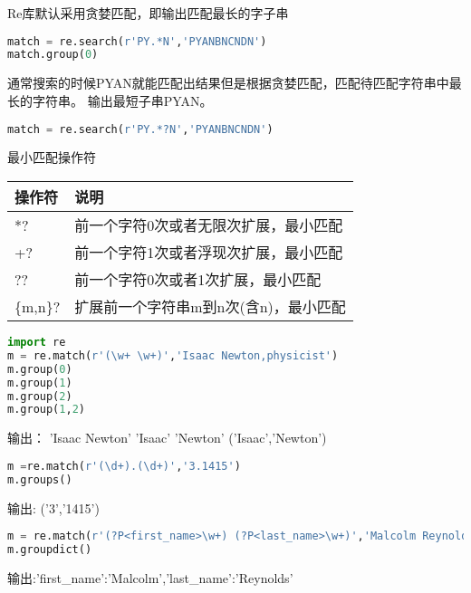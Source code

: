 Re库默认采用贪婪匹配，即输出匹配最长的字子串
\begin{lstlisting}[language=Python]
match = re.search(r'PY.*N','PYANBNCNDN')
match.group(0)
\end{lstlisting}
通常搜索的时候PYAN就能匹配出结果但是根据贪婪匹配，匹配待匹配字符串中最长的字符串。
输出最短子串PYAN。
\begin{lstlisting}[language=Python]
match = re.search(r'PY.*?N','PYANBNCNDN')
\end{lstlisting}
最小匹配操作符\newline
\begin{tabular}{|l|l|}
\hline
操作符&说明\\
\hline
*?&前一个字符0次或者无限次扩展，最小匹配\\
\hline
+?&前一个字符1次或者浮现次扩展，最小匹配\\
\hline
??&前一个字符0次或者1次扩展，最小匹配\\
\hline
\{m,n\}?&扩展前一个字符串m到n次(含n)，最小匹配\\
\hline
\end{tabular}
\begin{lstlisting}[language=Python]
import re
m = re.match(r'(\w+ \w+)','Isaac Newton,physicist')
m.group(0)
m.group(1)
m.group(2)
m.group(1,2)
\end{lstlisting}
输出：\newline
'Isaac Newton'\newline
'Isaac' \newline
'Newton'\newline
('Isaac','Newton')\newline
\begin{lstlisting}[language=Python]
m =re.match(r'(\d+).(\d+)','3.1415')
m.groups()
\end{lstlisting}
输出:\newline
('3','1415')\newline
\begin{lstlisting}[language=Python]
m = re.match(r'(?P<first_name>\w+) (?P<last_name>\w+)','Malcolm Reynolds')
m.groupdict()
\end{lstlisting}
输出:{'first\_name':'Malcolm','last\_name':'Reynolds'}\newline
